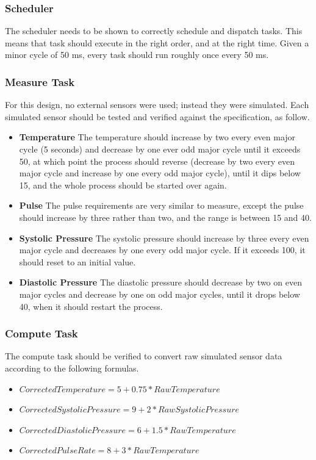 \documentclass[12pt]{article} %
\begin{document}
    \subsubsection{Scheduler}
    The scheduler needs to be shown to correctly schedule and dispatch tasks.
    This means that task should execute in the right order, and at the right
    time. Given a minor cycle of 50 ms, every task should run roughly once
    every 50 ms. 

    \subsubsection{Measure Task}
    For this design, no external sensors were used; instead they were
    simulated. Each simulated sensor should be tested and verified against the
    specification, as follow.
    \begin{itemize}
      \item \textbf{Temperature} The temperature should increase by two every
	even major cycle (5 seconds) and decrease by one ever odd major cycle
	until it exceeds 50, at which point the process should reverse
	(decrease by two every even major cycle and increase by one every odd
	major cycle), until it dips below 15, and the whole process should be
	started over again. 
      \item \textbf{Pulse} The pulse requirements are very similar to measure,
	except the pulse should increase by three rather than two, and the
	range is between 15 and 40.
      \item \textbf{Systolic Pressure} The systolic pressure should increase by
	three every even major cycle and decreases by one every odd major
	cycle. If it exceeds 100, it should reset to an initial value.
      \item \textbf{Diastolic Pressure} The diastolic pressure should decrease
	by two on even major cycles and decrease by one on odd major cycles,
	until it drops below 40, when it should restart the process.
    \end{itemize}

    \subsubsection{Compute Task}
    The compute task should be verified to convert raw simulated sensor data
    according to the following formulas.
    \begin{itemize}
      \item $CorrectedTemperature = 5 + 0.75 * RawTemperature$
      \item $CorrectedSystolicPressure = 9 + 2 * RawSystolicPressure$
      \item $CorrectedDiastolicPressure = 6 + 1.5 * RawTemperature$
      \item $CorrectedPulseRate = 8 + 3 * RawTemperature$
    \end{itemize}
\end{document}
